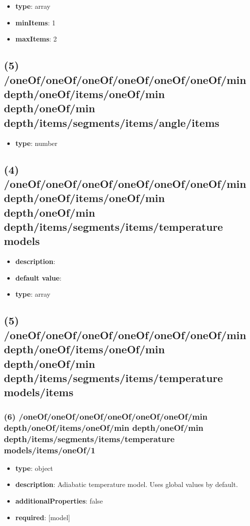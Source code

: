 \begin{itemize}[leftmargin=4em]\item {\bf type}: array
\item {\bf minItems}: 1
\item {\bf maxItems}: 2
\end{itemize}\subsection{(5) /oneOf/oneOf/oneOf/oneOf/oneOf/oneOf/min depth/oneOf/items/oneOf/min depth/oneOf/min depth/items/segments/items/angle/items}
\begin{itemize}[leftmargin=5em]\item {\bf type}: number
\end{itemize}\subsection{(4) /oneOf/oneOf/oneOf/oneOf/oneOf/oneOf/min depth/oneOf/items/oneOf/min depth/oneOf/min depth/items/segments/items/temperature models}
\begin{itemize}[leftmargin=4em]\item {\bf description}: 
\item {\bf default value}: 
\item {\bf type}: array
\end{itemize}\subsection{(5) /oneOf/oneOf/oneOf/oneOf/oneOf/oneOf/min depth/oneOf/items/oneOf/min depth/oneOf/min depth/items/segments/items/temperature models/items}

\subsubsection{(6) /oneOf/oneOf/oneOf/oneOf/oneOf/oneOf/min depth/oneOf/items/oneOf/min depth/oneOf/min depth/items/segments/items/temperature models/items/oneOf/1}
\begin{itemize}[leftmargin=6em]\item {\bf type}: object
\item {\bf description}: Adiabatic temperature model. Uses global values by default.
\item {\bf additionalProperties}: false
\item {\bf required}: [model]\end{itemize}
